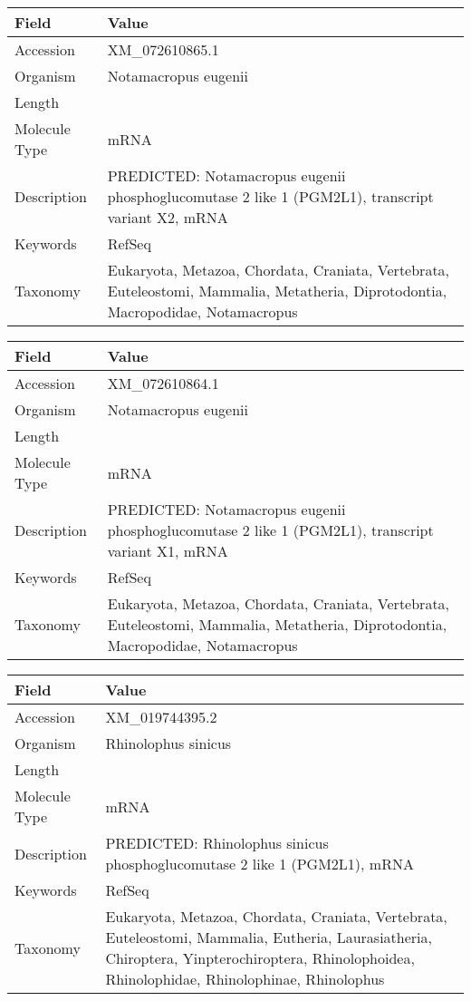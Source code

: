 \documentclass[10pt]{article}
\begin{document}
{\footnotesize
\begin{longtable}{>{\raggedright\arraybackslash}p{4.5cm} >{\raggedright\arraybackslash}p{11.5cm}}
\textbf{Field} & \textbf{Value} \\
\hline
Accession & XM\_072610865.1 \\
Organism & Notamacropus eugenii \\
Length & 10230 \\
Molecule Type & mRNA \\
Description & PREDICTED: Notamacropus eugenii phosphoglucomutase 2 like 1 (PGM2L1), transcript variant X2, mRNA \\
Keywords & RefSeq \\
Taxonomy & Eukaryota, Metazoa, Chordata, Craniata, Vertebrata, Euteleostomi, Mammalia, Metatheria, Diprotodontia, Macropodidae, Notamacropus \\
\end{longtable}
}

{\footnotesize
\begin{longtable}{>{\raggedright\arraybackslash}p{4.5cm} >{\raggedright\arraybackslash}p{11.5cm}}
\textbf{Field} & \textbf{Value} \\
\hline
Accession & XM\_072610864.1 \\
Organism & Notamacropus eugenii \\
Length & 10310 \\
Molecule Type & mRNA \\
Description & PREDICTED: Notamacropus eugenii phosphoglucomutase 2 like 1 (PGM2L1), transcript variant X1, mRNA \\
Keywords & RefSeq \\
Taxonomy & Eukaryota, Metazoa, Chordata, Craniata, Vertebrata, Euteleostomi, Mammalia, Metatheria, Diprotodontia, Macropodidae, Notamacropus \\
\end{longtable}
}

{\footnotesize
\begin{longtable}{>{\raggedright\arraybackslash}p{4.5cm} >{\raggedright\arraybackslash}p{11.5cm}}
\textbf{Field} & \textbf{Value} \\
\hline
Accession & XM\_019744395.2 \\
Organism & Rhinolophus sinicus \\
Length & 7753 \\
Molecule Type & mRNA \\
Description & PREDICTED: Rhinolophus sinicus phosphoglucomutase 2 like 1 (PGM2L1), mRNA \\
Keywords & RefSeq \\
Taxonomy & Eukaryota, Metazoa, Chordata, Craniata, Vertebrata, Euteleostomi, Mammalia, Eutheria, Laurasiatheria, Chiroptera, Yinpterochiroptera, Rhinolophoidea, Rhinolophidae, Rhinolophinae, Rhinolophus \\
\end{longtable}
}
\end{document}
